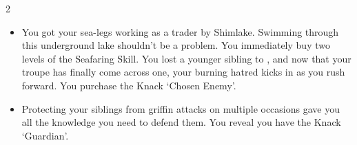 \begin{multicols}{2}
\begin{exampletext}
  \begin{itemize}
    \item\ifodd\thecycle%
      You got your sea-legs working as a trader by Shimlake.
      Swimming through this underground lake shouldn't be a problem.
      You immediately buy two levels of the Seafaring Skill.
    \else%
      You lost a younger sibling to , and now that your troupe has finally come across one, your burning hatred kicks in as you rush forward.
      You purchase the Knack `Chosen Enemy'.
    \fi
    \item
    Protecting your siblings from griffin attacks on multiple occasions gave you all the knowledge you need to defend them.
    You reveal you have the Knack `Guardian'.
  \end{itemize}
\end{exampletext}

\end{multicols}
